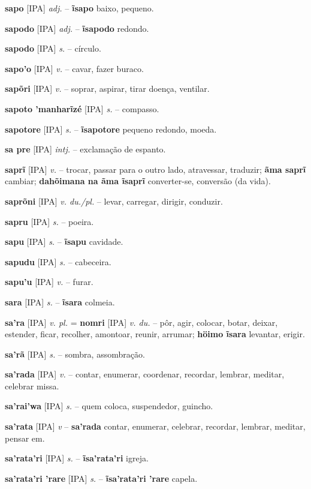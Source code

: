 \textbf{sapo} [IPA] \textit{adj.} -- \textbf{ĩsapo} baixo, pequeno.

\textbf{sapodo} [IPA] \textit{adj.} -- \textbf{ĩsapodo} redondo.

\textbf{sapodo} [IPA] \textit{s.} -- círculo.

\textbf{sapo'o} [IPA] \textit{v.} -- cavar, fazer buraco.

\textbf{sapõri} [IPA] \textit{v.} -- soprar, aspirar, tirar doença, ventilar.

\textbf{sapoto 'manharĩzé} [IPA] \textit{s.} -- compasso.

\textbf{sapotore} [IPA] \textit{s.} -- \textbf{ĩsapotore} pequeno redondo, moeda.

\textbf{sa pre} [IPA] \textit{intj.} -- exclamação de espanto.

\textbf{saprĩ} [IPA] \textit{v.} -- trocar, passar para o outro lado, atravessar, traduzir; \textbf{ãma saprĩ} cambiar; \textbf{dahõimana na ãma ĩsaprĩ} converter-se, conversão (da vida).

\textbf{saprõni} [IPA] \textit{v. du./pl.} -- levar, carregar, dirigir, conduzir.

\textbf{sapru} [IPA] \textit{s.} -- poeira.

\textbf{sapu} [IPA] \textit{s.} -- \textbf{ĩsapu} cavidade.

\textbf{sapudu} [IPA] \textit{s.} -- cabeceira.

\textbf{sapu'u} [IPA] \textit{v.} -- furar.

\textbf{sara} [IPA] \textit{s.} -- \textbf{ĩsara} colmeia.

\textbf{sa'ra} [IPA] \textit{v. pl.} = \textbf{nomri} [IPA] \textit{v. du.} -- pôr, agir, colocar, botar, deixar, estender, ficar, recolher, amontoar, reunir, arrumar; \textbf{höimo ĩsara} levantar, erigir.

\textbf{sa'rã} [IPA] \textit{s.} -- sombra, assombração.

\textbf{sa'rada} [IPA] \textit{v.} -- contar, enumerar, coordenar, recordar, lembrar, meditar, celebrar missa.

\textbf{sa'rai'wa} [IPA] \textit{s.} -- quem coloca, suspendedor, guincho.

\textbf{sa'rata} [IPA] \textit{v} -- \textbf{sa'rada} contar, enumerar, celebrar, recordar, lembrar, meditar, pensar em.

\textbf{sa'rata'ri} [IPA] \textit{s.} -- \textbf{ĩsa'rata'ri} igreja.

\textbf{sa'rata'ri 'rare} [IPA] \textit{s.} -- \textbf{ĩsa'rata'ri 'rare} capela.

